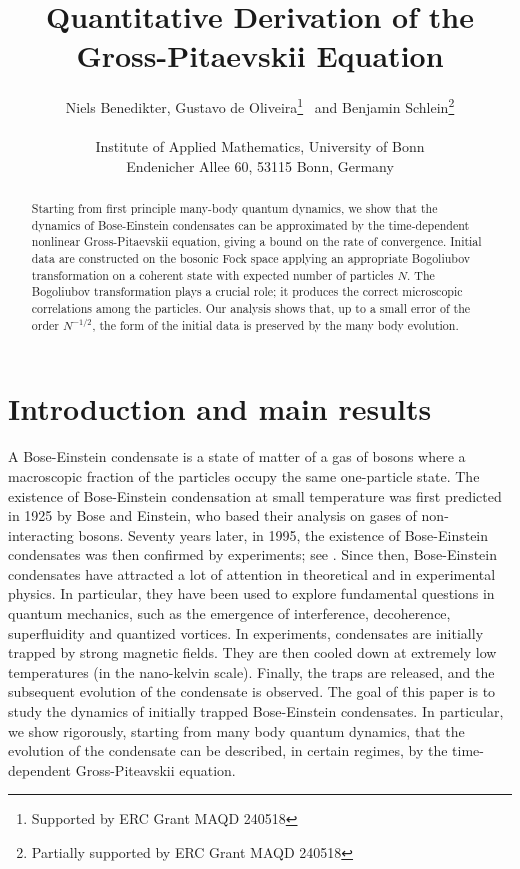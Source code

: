\documentclass[11pt,a4paper]{article}
\title{Quantitative Derivation of the Gross-Pitaevskii Equation}
\author{Niels Benedikter, Gustavo de Oliveira\thanks{Supported by ERC Grant MAQD 240518 }  \, and Benjamin Schlein\thanks{Partially supported by ERC Grant MAQD 240518} \\ \\ Institute of Applied Mathematics, University of Bonn\\ Endenicher Allee 60, 53115 Bonn, Germany}
\begin{document}
\maketitle

\begin{abstract}
Starting from first principle many-body quantum dynamics, we show that the dynamics of 
Bose-Einstein condensates can be approximated by the time-dependent nonlinear 
Gross-Pitaevskii equation, giving a bound on the rate of convergence. Initial data are constructed on the bosonic Fock space applying an appropriate Bogoliubov transformation on a coherent state with expected number of particles $N$. The Bogoliubov transformation plays a crucial role; it produces the correct microscopic correlations among the particles. Our analysis shows that, up to a small error of the order $N^{-1/2}$, the form of the initial data is preserved by the many body evolution.  
\end{abstract}

\section{Introduction and main results}
\label{s:intro}


A Bose-Einstein condensate is a state of matter of a gas of bosons where a macroscopic fraction of the particles occupy the same one-particle state. The existence of Bose-Einstein condensation at small temperature was first predicted in 1925 by Bose and Einstein, who based their analysis on gases of non-interacting bosons. Seventy years later, in 1995, the existence of Bose-Einstein condensates 
was then confirmed by experiments; see \cite{BEC1,BEC2}. Since then, Bose-Einstein condensates have attracted a lot of attention in theoretical and in experimental physics. In particular, they have been used to explore fundamental questions in quantum mechanics, such as the emergence of interference, decoherence, superfluidity and quantized vortices. In experiments, condensates are initially trapped by strong magnetic fields. They are then cooled down at extremely low temperatures (in the nano-kelvin scale). Finally, the traps are released, and the subsequent evolution of the condensate is observed. The goal of this paper is to study the dynamics of initially trapped Bose-Einstein condensates. In particular, we 
show rigorously, starting from many body quantum dynamics, that the evolution of the condensate can be described, in certain regimes, by the time-dependent Gross-Piteavskii equation. 
\end{document}
